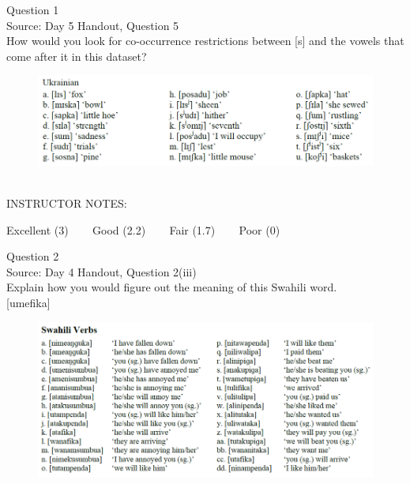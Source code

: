 \documentclass[12pt]{article}
\begin{document}
\begin{center}
\textbf{{\color{blue}{\HUGE START OF EXAM\\}}}

\textbf{{\color{blue}{\HUGE Student ID: 2357\\}}}

\textbf{{\color{blue}{\HUGE 12:30 - 12:45 PM\\}}}

\end{center}
\newpage

{\large Question 1}\\

Source: Day 5 Handout, Question 5\\

How would you look for co-occurrence restrictions between [s] and the vowels that come after it in this dataset?\\

\begin{figure}[H]
\includegraphics{../images/ukrainian.png}
\end{figure}

~\\
INSTRUCTOR NOTES: 


\vfill
Excellent (3) ~~~ Good (2.2) ~~~ Fair (1.7) ~~~ Poor (0)
\newpage

{\large Question 2}\\

Source: Day 4 Handout, Question 2(iii)\\

Explain how you would figure out the meaning of this Swahili word.\\

{[umefika]}

\begin{figure}[H]
\includegraphics{../images/swahiliverbs.png}
\end{figure}
\end{document}
